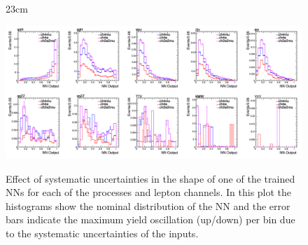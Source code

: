 \begin{landscape}
\begin{figure}[hbtp]{23cm}
	\caption{Effect of systematic uncertainties in the shape of one of the trained NNs for each of the processes and lepton channels. In this plot the histograms show the nominal distribution of the NN and the error bars indicate the maximum yield oscillation (up/down) per bin due to the systematic uncertainties of the inputs.}
	\centering
	\includegraphics[scale=0.55]{ChapterAnalysis/figs/nn_shape_systematic_uncertainty_per_proc_channel}
	\label{fig:nn_systematic_shifts}
\end{figure}
\end{landscape}


